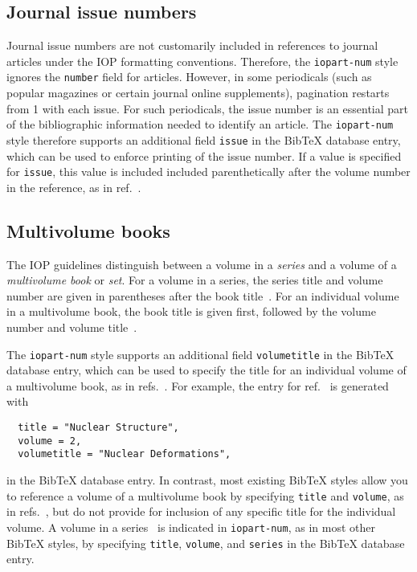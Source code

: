 \documentclass[12pt]{iopart}
\newcommand{\BibTeX}{Bib\TeX}
\begin{document}
\subsection{Journal issue numbers}

Journal issue numbers are not customarily included in references to
journal articles under the IOP formatting conventions.
Therefore, the
\texttt{iopart-num} style ignores the
\verb+number+ field for articles.  
However, in some periodicals (such as popular magazines or certain
journal online supplements), pagination restarts from 1 with each
issue.  For such periodicals, the issue number is an essential part of
the bibliographic information needed to identify an article.  The
\texttt{iopart-num} style therefore supports an additional field
\verb+issue+ in the \BibTeX{} database entry, which can be used to 
enforce printing of the issue number.  If a value is specified for
\verb+issue+, this value is included included parenthetically after the volume
number in the reference, as in
ref.~\cite{zamfir2005:132te-beta-enam04}.

\subsection{Multivolume books}

The IOP guidelines distinguish between a volume
in a {\it series}
and a volume of a {\it  multivolume book} or {\it set}.  For a volume in
a series, the series title and volume number are given in parentheses
after the book title~\cite{ex8}.
For an individual volume in a multivolume book, the book title is
given first, followed by the volume number and volume title~\cite{ex9}.

The
\texttt{iopart-num} style supports an additional field
\verb+volumetitle+ in the \BibTeX{} database entry, which can be used to 
specify the title for an individual volume of a multivolume
book, as in refs.~\cite{ex9,bohr1998:v2}.  For example, the entry for
ref.~\cite{bohr1998:v2} is generated with
\begin{verbatim}
  title = "Nuclear Structure",
  volume = 2,
  volumetitle = "Nuclear Deformations",
\end{verbatim}
in the \BibTeX{} database entry.  In contrast, most existing \BibTeX{} styles 
allow you to reference a volume of a multivolume
book by specifying \verb+title+ and
\verb+volume+, as in
refs.~\cite{ex7,siegbahn1965:v1}, but do not provide for inclusion of
any specific title for the individual volume.  A volume in a
series~\cite{ex8,iachello2006:liealg} is indicated in
\texttt{iopart-num}, as in most other \BibTeX{}
styles, 
by specifying
\verb+title+, \verb+volume+, and
\verb+series+ in the \BibTeX{} database entry.  
\end{document}
